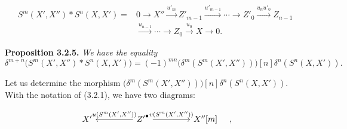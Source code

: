 \begin{equation}
\begin{aligned}
S^m(X',X'')*S^n(X,X')={}&
0\longrightarrow X''\xrightarrow{u'_m}Z'_{m-1}
\xrightarrow{u'_{m-1}}\cdots\longrightarrow Z'_0
\xrightarrow{u_nu'_0}Z_{n-1}\\
&\xrightarrow{u_{n-1}}\cdots\longrightarrow Z_0
\xrightarrow{u_0}X\longrightarrow0.
\end{aligned}
\tag{3.2.4.1}
\end{equation}

\medskip\noindent\textbf{Proposition 3.2.5.}\quad
\textit{We have the equality}
\[
\delta^{m+n}\bigl(S^m(X',X'')*S^n(X,X')\bigr)=
(-1)^{mn}\bigl(\delta^m(S^m(X',X''))\bigr)[n]
\delta^n(S^n(X,X')).
\]

Let us determine the morphism
$\bigl(\delta^m(S^m(X',X''))\bigr)[n]\delta^n(S^n(X,X'))$.
With the notation of (3.2.1), we have two diagrams:

\[
\begin{tikzcd}[column sep=4.5em]
X' & {Z'}^\bullet
  \arrow[l,"{u(S^m(X',X''))}"']
  \arrow[r,"{v(S^m(X',X''))}"]
& X''[m]
\end{tikzcd}
\quad,
\]
\endgroup
